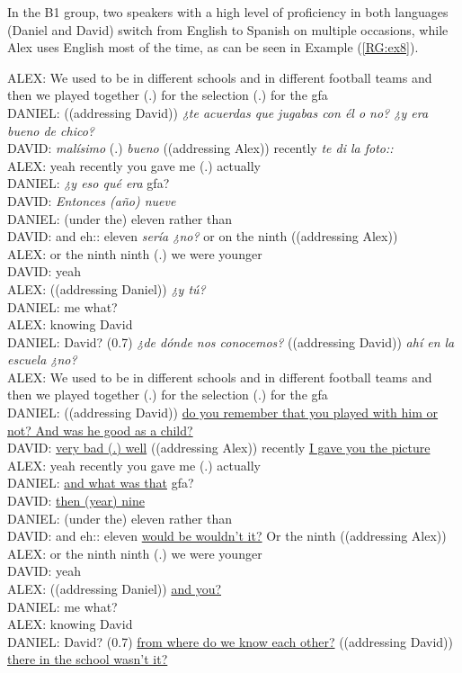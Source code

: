 \documentclass[output=paper]{langscibook}
\begin{document}
In the B1 group, two speakers with a high level of proficiency in both languages (Daniel and David) switch from English to Spanish on multiple occasions, while Alex uses English most of the time, as can be seen in Example (\ref{RG:ex8}).

\begin{exe}\ex\label{RG:ex8}
ALEX:  We used to be in different schools and in different football teams and then we played together (.) for the selection (.) for the gfa\\
DANIEL: ((addressing David)) \textit{¿te acuerdas que jugabas con él o no? ¿y era bueno de chico?}\\
DAVID: \textit{malísimo} (.) \textit{bueno} ((addressing Alex)) recently \textit{te di la foto::}\\
ALEX: yeah recently you gave me (.) actually\\
DANIEL: \textit{¿y eso qué era} gfa? \\
DAVID: \textit{Entonces (año) nueve}\\
DANIEL: (under the) eleven rather than\\
DAVID: and eh:: eleven \textit{sería ¿no?} or on the ninth ((addressing Alex))\\
ALEX: or the ninth ninth (.) we were younger\\
DAVID: yeah\\
ALEX: ((addressing Daniel)) \textit{¿y tú?}\\
DANIEL: me what?\\
ALEX: knowing David\\
DANIEL: David? (0.7) \textit{¿de dónde nos conocemos?} ((addressing David)) \textit{ahí en la escuela ¿no?}\\

ALEX: We used to be in different schools and in different football teams and then we played together (.) for the selection (.) for the gfa\\
DANIEL: ((addressing David)) \ul{do you remember that you played with him or not? And was he good as a child?}\\
DAVID: \ul{very bad (.) well} ((addressing Alex)) recently \ul{I gave you the picture}\\
ALEX: yeah recently you gave me (.) actually\\
DANIEL: \ul{and what was that} gfa?\\
DAVID: \ul{then (year) nine}\\
DANIEL: (under the) eleven rather than\\
DAVID: and eh:: eleven \ul{would be wouldn’t it?} Or the ninth ((addressing Alex))\\
ALEX: or the ninth ninth (.) we were younger\\
DAVID: yeah\\
ALEX: ((addressing Daniel)) \ul{and you?}\\
DANIEL: me what?\\
ALEX: knowing David\\
DANIEL: David? (0.7) \ul{from where do we know each other?} ((addressing David)) \ul{there in the school wasn’t it?}
\end{exe}
\end{document}
